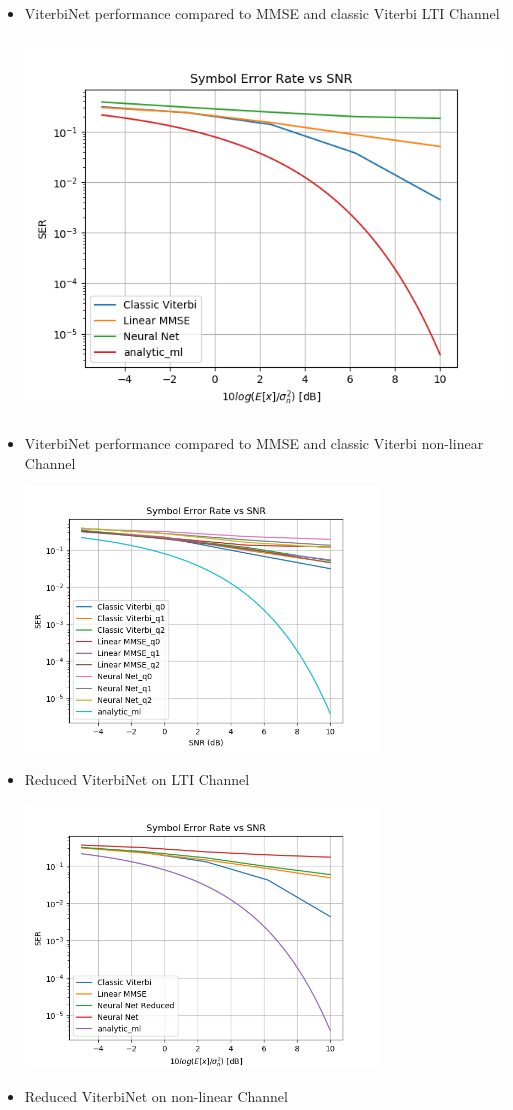 \documentclass[12pt,a4paper]{article}
\begin{document}
\begin{itemize}
\item ViterbiNet performance compared to MMSE and classic Viterbi LTI Channel

	\includegraphics[width=\textwidth,height = 10cm]{results/lti_normal}

\item ViterbiNet performance compared to MMSE and classic Viterbi non-linear Channel

	\includegraphics[width=\textwidth,height = 7cm]{results/quant_standard}

\item Reduced ViterbiNet on LTI Channel

	\includegraphics[width=\textwidth,height = 7cm]{results/lti_reduced}

\item Reduced ViterbiNet on non-linear Channel

\end{itemize}
\end{document}
